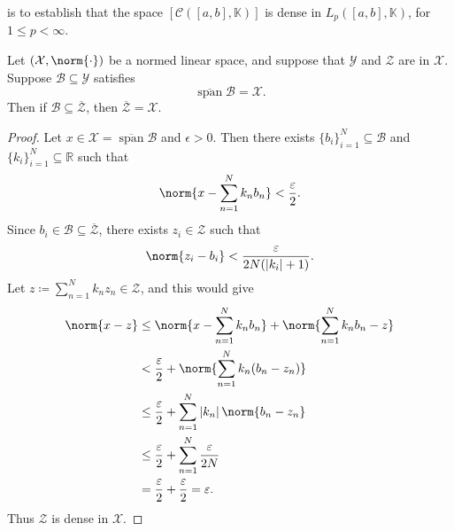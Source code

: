 \documentclass[notoc,notitlepage]{tufte-book}
\DeclareMathOperator{\Span}{span}
\begin{document}
 is to establish that the space
$[\mathcal{C}([a, b], \mathbb{K})]$ is dense in $L_p([a, b], \mathbb{K})$,
for $1 \leq p < \infty$.


\begin{lemma}[Lemma 6.31]\label{lemma:lemma_6_31}
  Let $(\mathcal{X}, \norm{\cdot})$ be a normed linear space,
  and suppose that $\mathcal{Y}$ and $\mathcal{Z}$ are 
  in $\mathcal{X}$. Suppose $\mathcal{B} \subseteq \mathcal{Y}$ satisfies
  \begin{equation*}
    \overline{\Span} \mathcal{B} = \mathcal{X}.
  \end{equation*}
  Then if $\mathcal{B} \subseteq \overline{\mathcal{Z}}$, 
  then $\overline{\mathcal{Z}} = \mathcal{X}$.
\end{lemma}

\begin{proof}
  Let $x \in \mathcal{X} = \overline{\Span} \mathcal{B}$ and $\epsilon > 0$.
  Then there exists $\{ b_i \}_{i=1}^{N} \subseteq \mathcal{B}$ and
  $\{ k_i \}_{i=1}^{N} \subseteq \mathbb{R}$ such that
  \begin{equation*}
    \norm{ x - \sum_{n=1}^{N} k_n b_n } < \frac{\epsilon}{2}.
  \end{equation*}
  Since $b_i \in \mathcal{B} \subseteq \overline{\mathcal{Z}}$,
  there exists $z_i \in \mathcal{Z}$ such that
  \begin{equation*}
    \norm{z_i - b_i} < \frac{\epsilon}{2N(\abs{k_i} + 1)}.
  \end{equation*}
  Let $z \coloneqq \sum_{n=1}^{N} k_n z_n \in \mathcal{Z}$,
  and this would give
  \begin{align*}
    \norm{x - z}
    &\leq \norm{ x - \sum_{n=1}^{N} k_n b_n } + \norm{ \sum_{n=1}^{N} k_n b_n -
      z} \\
    &< \frac{\epsilon}{2} + \norm{ \sum_{n=1}^{N} k_n (b_n - z_n) } \\
    &\leq \frac{\epsilon}{2} + \sum_{n=1}^{N} \abs{k_n} \norm{b_n - z_n} \\
    &\leq \frac{\epsilon}{2} + \sum_{n=1}^{N} \frac{\epsilon}{2N} \\
    &= \frac{\epsilon}{2} + \frac{\epsilon}{2} = \epsilon.
  \end{align*}
  Thus $\mathcal{Z}$ is dense in $\mathcal{X}$.
\end{proof}
\end{document}
